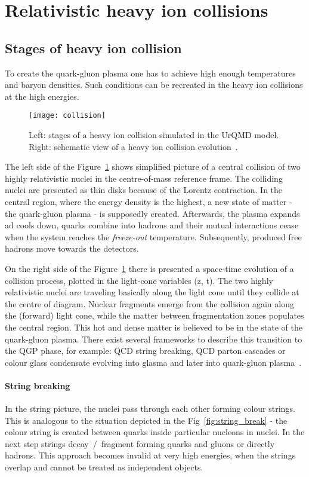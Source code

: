   \section{Relativistic heavy ion collisions}
    \subsection{Stages of heavy ion collision}

      To create the quark-gluon plasma one has to achieve high enough temperatures and baryon densities.
      Such conditions can be recreated in the heavy ion collisions at the high energies.
      \begin{figure}[h]
        \centering
        \texttt{[image: collision]}
        \caption{Left: stages of a heavy ion collision simulated in the UrQMD model. Right: schematic view of a heavy ion collision evolution~\cite{drkisiel}.}
        \label{fig:colision}
      \end{figure}
      The left side of the Figure~\ref{fig:colision} shows simplified picture of a central collision of two highly relativistic nuclei in the centre-of-mass reference frame.
      The colliding nuclei are presented as thin disks because of the Lorentz contraction.
      In the central region, where the energy density is the highest, a new state of matter - the quark-gluon plasma - is supposedly created.
      Afterwards, the plasma expands ad cools down, quarks combine into hadrons and their mutual interactions cease when the system reaches the \textit{freeze-out} temperature.
      Subsequently, produced free hadrons move towards the detectors.

      On the right side of the Figure~\ref{fig:colision} there is presented a space-time evolution of a collision process, plotted in the light-cone variables (z, t).
      The two highly relativistic nuclei are traveling basically along the light cone until they collide at the centre of diagram. 
      Nuclear fragments emerge from the collision again along the (forward) light cone, while the matter between fragmentation zones populates the central region.
      This hot and dense matter is believed to be in the state of the quark-gluon plasma.
      There exist several frameworks to describe this transition to the QGP phase, for example: QCD string breaking, QCD parton cascades or colour glass condensate evolving into glasma and later into quark-gluon plasma~\cite{florkowski}.
      \paragraph{String breaking}
      In the string picture, the nuclei pass through each other forming colour strings.
      This is analogous to the situation depicted in the Fig~\ref{fig:string_break} -  the colour string is created between quarks inside particular nucleons in nuclei.
      In the next step strings decay~/~fragment forming quarks and gluons or directly hadrons.
      This approach becomes invalid at very high energies, when the strings overlap and cannot be treated as independent objects.

